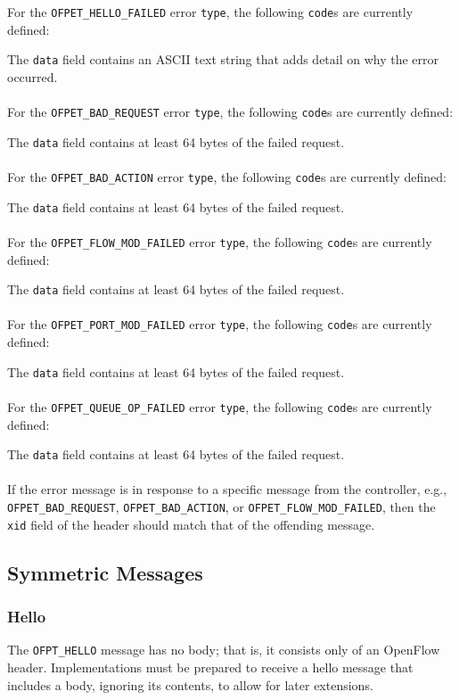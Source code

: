 
For the \verb|OFPET_HELLO_FAILED| error \verb|type|, the following \verb|code|s are currently defined:


The \verb|data| field contains an ASCII text string that adds detail on why the error occurred.
\\\\
For the \verb|OFPET_BAD_REQUEST| error \verb|type|, the following \verb|code|s are currently defined:


The \verb|data| field contains at least 64 bytes of the failed request.
\\\\
For the \verb|OFPET_BAD_ACTION| error \verb|type|, the following \verb|code|s are currently defined:


The \verb|data| field contains at least 64 bytes of the failed request.
\\\\
For the \verb|OFPET_FLOW_MOD_FAILED| error \verb|type|, the following \verb|code|s are currently defined:


The \verb|data| field contains at least 64 bytes of the failed request.
\\\\
For the \verb|OFPET_PORT_MOD_FAILED| error \verb|type|, the following \verb|code|s are currently defined:


The \verb|data| field contains at least 64 bytes of the failed request.
\\\\
For the \verb|OFPET_QUEUE_OP_FAILED| error \verb|type|, the following \verb|code|s are currently defined:


The \verb|data| field contains at least 64 bytes of the failed request.
\\\\
If the error message is in response to a specific message from the controller, e.g., \verb|OFPET_BAD_REQUEST|, \verb|OFPET_BAD_ACTION|, or \verb|OFPET_FLOW_MOD_FAILED|, then the \verb|xid| field of the header should match that of the offending message.

\subsection{Symmetric Messages}
\subsubsection{Hello}
The \verb|OFPT_HELLO| message has no body; that is, it consists only of an OpenFlow header. Implementations must be prepared to receive a hello message that includes a body, ignoring its contents, to allow for later extensions. 

